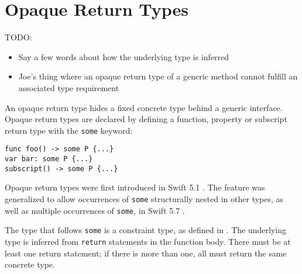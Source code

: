\documentclass[../generics]{subfiles}
\begin{document}
\chapter[]{Opaque Return Types}\label{opaqueresult}

\ifWIP


TODO:
\begin{itemize}
\item Say a few words about how the underlying type is inferred
\item Joe's thing where an opaque return type of a generic method cannot fulfill an associated type requirement
\end{itemize}

An opaque return type hides a fixed concrete type behind a generic interface. Opaque return types are declared by defining a function, property or subscript return type with the \texttt{some} keyword:
\begin{Verbatim}
func foo() -> some P {...}
var bar: some P {...}
subscript() -> some P {...}
\end{Verbatim}
Opaque return types were first introduced in Swift 5.1 \cite{se0244}. The feature was generalized to allow occurrences of \texttt{some} structurally nested in other types, as well as multiple occurrences of \texttt{some}, in Swift 5.7 \cite{se0328}.

The type that follows \texttt{some} is a constraint type, as defined in . The underlying type is inferred from \texttt{return} statements in the function body. There must be at least one return statement; if there is more than one, all must return the same concrete type.
\end{document}
